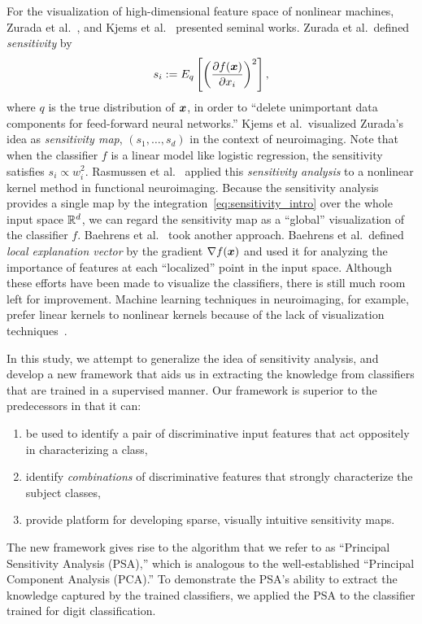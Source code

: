 For the visualization of high-dimensional feature space of nonlinear machines,
Zurada et al.~\cite{Zurada1994,Zurada1997},  and Kjems et al.~\cite{Kjems2002}
presented seminal works.
%
Zurada et al.\ defined \textit{sensitivity} by
\begin{equation}
 \label{eq:sensitivity_intro}
 s_i := E_q \left[ \left(\frac{\partial f(\mbox{\boldmath $x$})}{\partial x_i} \right)^2 \right],
\end{equation}
where $q$ is the true distribution of $\mbox{\boldmath $x$}$,
in order to ``delete unimportant data components for feed-forward neural networks.''
Kjems et al.\ visualized Zurada's idea as \textit{sensitivity map}, $\left(s_1, \dots, s_d\right)$
in the context of neuroimaging.
%
Note that when the classifier $f$ is a linear model like logistic
regression, the sensitivity satisfies $s_i \propto w_i^2$.
%
Rasmussen et al.~\cite{Rasmussen2011} applied this \textit{sensitivity analysis}
to a nonlinear kernel method in functional neuroimaging.
%
Because the sensitivity analysis provides a single map by the
integration~\eqref{eq:sensitivity_intro} over the
whole input space $\mathbb{R}^{d}$, we can regard the sensitivity map as a
``global'' visualization of the classifier $f$.
%
Baehrens et al.~\cite{Baehrens2010} took another approach.
%
Baehrens et al.\ defined \textit{local explanation vector} by the
gradient $\nabla f (\mbox{\boldmath $x$})$ and used it for
analyzing the importance of features at each ``localized'' point in the
input space.
%
Although these efforts have been made to visualize the
classifiers,
there is still much room left for improvement.
%
Machine learning techniques in neuroimaging, for example,
prefer linear kernels to nonlinear kernels because of the lack of
visualization techniques~\cite{LaConte2005}.

In this study, we attempt to  generalize the idea of sensitivity
analysis, and develop a new framework that aids us in extracting the
knowledge from classifiers that are trained in a supervised manner.
%
Our framework is superior to the predecessors in that it can:
\begin{enumerate}
 \item be used to identify a pair of discriminative input
       features that act oppositely in characterizing a class,
 \item identify \textit{combinations} of discriminative features that strongly
       characterize the subject classes,
 \item provide platform for developing sparse, visually intuitive
       sensitivity maps.
\end{enumerate}
%
The new framework gives rise to the algorithm that we refer
to as ``Principal Sensitivity Analysis (PSA),'' which is analogous to
the well-established ``Principal Component Analysis (PCA).''
%
To demonstrate the PSA's ability to extract the knowledge captured by
the trained classifiers, we applied the PSA to the classifier trained
for digit classification.

